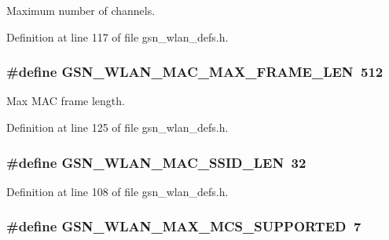 Maximum number of channels. 



Definition at line 117 of file gsn\_\-wlan\_\-defs.h.

\hypertarget{a00641_gae731ba25818bdbc75a996de819a860e6}{
\subsubsection[{GSN\_\-WLAN\_\-MAC\_\-MAX\_\-FRAME\_\-LEN}]{\setlength{\rightskip}{0pt plus 5cm}\#define GSN\_\-WLAN\_\-MAC\_\-MAX\_\-FRAME\_\-LEN~512}}
\label{a00641_gae731ba25818bdbc75a996de819a860e6}


Max MAC frame length. 



Definition at line 125 of file gsn\_\-wlan\_\-defs.h.

\hypertarget{a00641_ga93c24ba92c21c82b929e23b532ec4002}{
\subsubsection[{GSN\_\-WLAN\_\-MAC\_\-SSID\_\-LEN}]{\setlength{\rightskip}{0pt plus 5cm}\#define GSN\_\-WLAN\_\-MAC\_\-SSID\_\-LEN~32}}
\label{a00641_ga93c24ba92c21c82b929e23b532ec4002}


Definition at line 108 of file gsn\_\-wlan\_\-defs.h.

\hypertarget{a00641_ga8c7cea28939d8ce06e159841483e73c9}{
\subsubsection[{GSN\_\-WLAN\_\-MAX\_\-MCS\_\-SUPPORTED}]{\setlength{\rightskip}{0pt plus 5cm}\#define GSN\_\-WLAN\_\-MAX\_\-MCS\_\-SUPPORTED~7}}
\label{a00641_ga8c7cea28939d8ce06e159841483e73c9}


